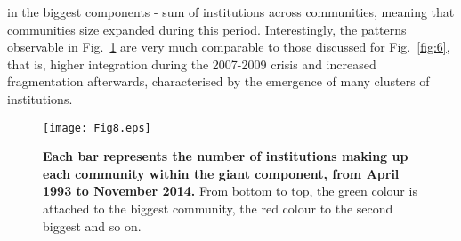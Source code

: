 \documentclass[a4paper,10pt]{article}
\begin{document}
in the biggest components - sum of institutions across communities,  meaning that communities size expanded during this period. Interestingly, the patterns observable in Fig.~\ref{fig:8} are very
much comparable to those discussed for Fig.~\ref{fig:6}, that is, higher integration during the 2007-2009 crisis and increased fragmentation afterwards, 
characterised by the emergence of many clusters of institutions. %
\begin{figure}[!h]
\texttt{[image: Fig8.eps]}
\caption{{\bf Each bar represents the number of institutions making up each community within the giant component, from April 1993 to November 2014.} From 
bottom to top, the green colour is attached to the biggest community, the red colour to the second biggest and so on.}
\label{fig:8}
\end{figure}
\end{document}
